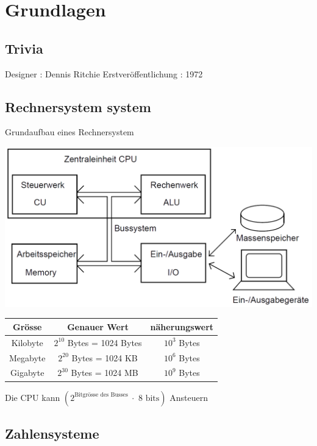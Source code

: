 
\section{Grundlagen}

\subsection{Trivia}

Designer : Dennis Ritchie \newline
Erstveröffentlichung : 1972

\subsection{Rechnersystem system}

Grundaufbau eines Rechnersystem

\includegraphics[width=1\columnwidth]{Pictures/PC_system_basicssystem.png}

\begin{center}
    \begin{tabular}{|c|c|c|} \hline  
        Grösse & Genauer Wert & näherungswert \\ \hline  
        Kilobyte & $2^{10}$ Bytes = 1024 Bytes & $10^3$ Bytes \\ \hline  
        Megabyte & $2^{20}$ Bytes = 1024 KB & $10^6$ Bytes \\ \hline  
        Gigabyte & $2^{30}$ Bytes = 1024 MB & $10^9$ Bytes \\ \hline 
    \end{tabular}
\end{center}

Die CPU kann $(2^{\text{Bitgrösse des Busses }} \cdot \text{ 8 bits})$ Ansteuern

\subsection{Zahlensysteme}

